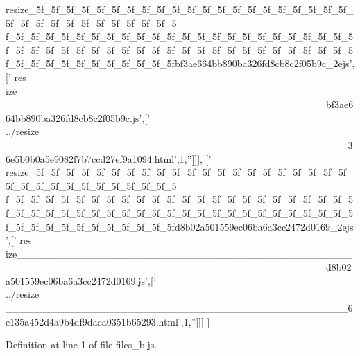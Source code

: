 \begin{DoxyCode}
{      resize\_5f\_5f\_5f\_5f\_5f\_5f\_5f\_5f\_5f\_5f\_5f\_5f\_5f\_5f\_5f\_5f\_5f\_5f\_5f\_5f\_5f\_5f\_5f\_5f\_5f\_5f\_5f\_5f\_5f\_5f\_5f\_5f\_5
      f\_5f\_5f\_5f\_5f\_5f\_5f\_5f\_5f\_5f\_5f\_5f\_5f\_5f\_5f\_5f\_5f\_5f\_5f\_5f\_5f\_5f\_5f\_5f\_5f\_5f\_5f\_5f\_5f\_5f\_5f\_5f\_5f\_5f\_5f\_5f\_5f\_5f\_5f\_5f\_5f\_5f\_5f\_5f\_5f\_5f\_5f\_5f\_5f\_5f\_5f\_5f\_5f\_5f\_5f\_5f\_5f\_5fbf3ae664bb890ba326fd8cb8c2f05b9c\_2ejs'},[\textcolor{stringliteral}{'
      res
      ize\_\_\_\_\_\_\_\_\_\_\_\_\_\_\_\_\_\_\_\_\_\_\_\_\_\_\_\_\_\_\_\_\_\_\_\_\_\_\_\_\_\_\_\_\_\_\_\_\_\_\_\_\_\_\_\_\_\_\_\_\_\_\_\_\_\_\_\_\_\_\_\_\_\_\_\_\_\_\_\_\_\_\_\_\_\_\_\_\_\_bf3ae664bb890ba326fd8cb8c2f05b9c.js'},[\textcolor{stringliteral}{'
      ../resize\_\_\_\_\_\_\_\_\_\_\_\_\_\_\_\_\_\_\_\_\_\_\_\_\_\_\_\_\_\_\_\_\_\_\_\_\_\_\_\_\_\_\_\_\_\_\_\_\_\_\_\_\_\_\_\_\_\_\_\_\_\_\_\_\_\_\_\_\_\_\_\_\_\_\_\_\_\_\_\_\_\_\_\_\_\_\_\_\_\_36e5b0b0a5e9082f7b7ccd27ef9a1094.html'},1,\textcolor{stringliteral}{''}]]],
  [\textcolor{stringliteral}{'
      resize\_5f\_5f\_5f\_5f\_5f\_5f\_5f\_5f\_5f\_5f\_5f\_5f\_5f\_5f\_5f\_5f\_5f\_5f\_5f\_5f\_5f\_5f\_5f\_5f\_5f\_5f\_5f\_5f\_5f\_5f\_5f\_5f\_5
      f\_5f\_5f\_5f\_5f\_5f\_5f\_5f\_5f\_5f\_5f\_5f\_5f\_5f\_5f\_5f\_5f\_5f\_5f\_5f\_5f\_5f\_5f\_5f\_5f\_5f\_5f\_5f\_5f\_5f\_5f\_5f\_5f\_5f\_5f\_5f\_5f\_5f\_5f\_5f\_5f\_5f\_5f\_5f\_5f\_5f\_5f\_5f\_5f\_5f\_5f\_5f\_5f\_5f\_5f\_5f\_5f\_5fd8b02a501559ec06ba6a3cc2472d0169\_2ejs'},[\textcolor{stringliteral}{'
      res
      ize\_\_\_\_\_\_\_\_\_\_\_\_\_\_\_\_\_\_\_\_\_\_\_\_\_\_\_\_\_\_\_\_\_\_\_\_\_\_\_\_\_\_\_\_\_\_\_\_\_\_\_\_\_\_\_\_\_\_\_\_\_\_\_\_\_\_\_\_\_\_\_\_\_\_\_\_\_\_\_\_\_\_\_\_\_\_\_\_\_\_d8b02a501559ec06ba6a3cc2472d0169.js'},[\textcolor{stringliteral}{'
      ../resize\_\_\_\_\_\_\_\_\_\_\_\_\_\_\_\_\_\_\_\_\_\_\_\_\_\_\_\_\_\_\_\_\_\_\_\_\_\_\_\_\_\_\_\_\_\_\_\_\_\_\_\_\_\_\_\_\_\_\_\_\_\_\_\_\_\_\_\_\_\_\_\_\_\_\_\_\_\_\_\_\_\_\_\_\_\_\_\_\_\_6e135a452d4a9b4df9daea0351b65293.html'},1,\textcolor{stringliteral}{''}]]]
]
\end{DoxyCode}


Definition at line 1 of file files\+\_\+b.\+js.

